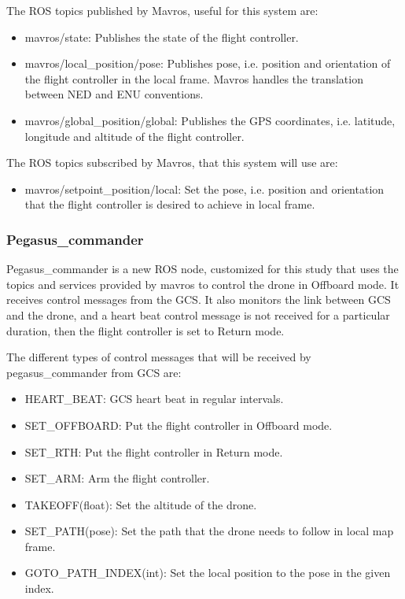 The ROS topics published by Mavros, useful for this system are:
\begin{itemize}
  \item mavros/state: Publishes the state of the flight controller.
  \item mavros/local\_position/pose: Publishes pose, i.e. position and orientation of the flight controller in the local frame. Mavros handles the translation between NED and ENU conventions.
  \item mavros/global\_position/global: Publishes the GPS coordinates, i.e. latitude, longitude and altitude of the flight controller.
\end{itemize}

The ROS topics subscribed by Mavros, that this system will use are:
\begin{itemize}
  \item mavros/setpoint\_position/local: Set the pose, i.e. position and orientation that the flight controller is desired to achieve in local frame.
\end{itemize}

\subsubsection{Pegasus\_commander} \label{section:pegasus-commander}

Pegasus\_commander is a new ROS node, customized for this study that uses the topics and services provided by mavros to control the drone in Offboard mode. It receives control messages from the GCS. It also monitors the link between GCS and the drone, and a heart beat control message is not received for a particular duration, then the flight controller is set to Return mode.

The different types of control messages that will be received by pegasus\_commander from GCS are:
\begin{itemize}
  \item HEART\_BEAT: GCS heart beat in regular intervals.
  \item SET\_OFFBOARD: Put the flight controller in Offboard mode.
  \item SET\_RTH: Put the flight controller in Return mode.
  \item SET\_ARM: Arm the flight controller.
  \item TAKEOFF(float): Set the altitude of the drone.
  \item SET\_PATH(pose): Set the path that the drone needs to follow in local map frame.
  \item GOTO\_PATH\_INDEX(int): Set the local position to the pose in the given index.
\end{itemize}

